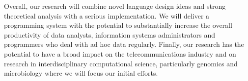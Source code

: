 \documentclass[11pt]{article}
\begin{document}

Overall, our research will combine novel language design ideas and
strong theoretical analysis with a serious implementation.  We will
deliver a programming system with the potential to substantially
increase the overall productivity of data analysts, 
information systems administrators
and programmers who
deal with ad hoc data regularly.  Finally, our research has the potential
to have  a
broad impact on the telecommunications industry and on
research in interdisciplinary computational science,
particularly genomics and microbiology where we will focus
our initial efforts.
\end{document}
